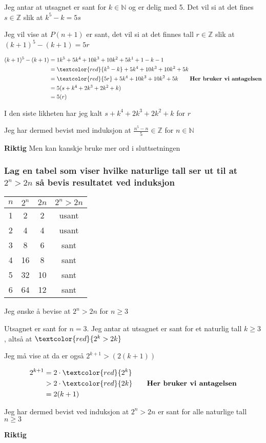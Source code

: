 \documentclass{article}
\begin{document}
Jeg antar at utsagnet er sant for $k \in \mathbb{N}$ og er delig med 5. Det vil si at det fines $s \in \mathbb{Z}$ slik at $k^5-k=5s$

Jeg vil vise at $P(n+1)$ er sant, det vil si at det finnes tall $r \in \mathbb{Z}$ slik at $(k+1)^5-(k+1)=5r$

\begin{align*}
    (k+1)^5-(k+1) &= 1k^5+5k^4+10k^3+10k^2+5k^1+1-k-1 \\
    &= \textcolor{red}{k^5-k}+5k^4+10k^3+10k^2+5k \\
    &= \textcolor{red}{5r}+5k^4+10k^3+10k^2+5k \qquad \textbf{Her bruker vi antagelsen}\\
    &= 5(s+k^4+2k^3+2k^2+k) \\
    &= 5(r)
\end{align*}

I den siste likheten har jeg kalt $s+k^4+2k^3+2k^2+k$ for $r$

Jeg har dermed bevist med induksjon at $\frac{n^5-n}{5} \in \mathbb{Z}$ for $n \in \mathbb{N}$

\textbf{Riktig}
Men kan kanskje bruke mer ord i sluttsetningen

\subsubsection{Lag en tabel som viser hvilke naturlige tall ser ut til at $2^n > 2n$ så bevis resultatet ved induksjon}

\begin{tabular}{|c|c|c|c|}
    \hline
    $n$ & $2^n$ & $2n$ & $2^n > 2n$ \\
    \hline
    1 & 2 & 2 & usant \\
    2 & 4 & 4 & usant \\
    3 & 8 & 6 & sant \\
    4 & 16 & 8 & sant \\
    5 & 32 & 10 & sant \\
    6 & 64 & 12 & sant \\
    \hline
\end{tabular}

Jeg ønske å bevise at $2^n > 2n$ for $n \ge 3$

Utsagnet er sant for $n=3$. Jeg antar at utsagnet er sant for et naturlig tall $k \ge 3$, altså at $\textcolor{red}{2^k > 2k}$

Jeg må vise at da er også $2^{k+1} > (2(k+1))$

\begin{align*}
2^{k+1} &= 2 \cdot \textcolor{red}{2^k} \\
&> 2 \cdot \textcolor{red}{2k} \qquad \textbf{Her bruker vi antagelsen} \\
&= 2(k+1)
\end{align*}

Jeg har dermed bevist ved induksjon at $2^n > 2n$ er sant for alle naturlige tall $n \ge 3$

\textbf{Riktig}



\end{document}
